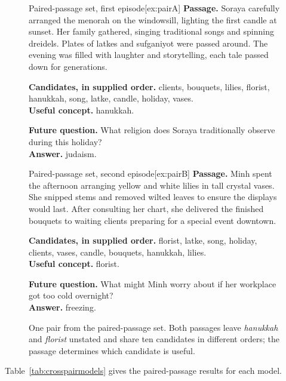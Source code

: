 \begin{figure}[t]
\centering
\begin{minipage}[t]{0.485\textwidth}
\begin{sdabox}[example]{Paired-passage set, first episode}[ex:pairA]
\textbf{Passage.} Soraya carefully arranged the menorah on the windowsill, lighting the first candle at sunset. Her family gathered, singing traditional songs and spinning dreidels. Plates of latkes and sufganiyot were passed around. The evening was filled with laughter and storytelling, each tale passed down for generations.

\medskip
\textbf{Candidates, in supplied order.} clients, bouquets, lilies, florist, hanukkah, song, latke, candle, holiday, vases.\\
\textbf{Useful concept.} hanukkah.

\medskip
\textbf{Future question.} What religion does Soraya traditionally observe during this holiday?\\
\textbf{Answer.} judaism.
\end{sdabox}
\end{minipage}\hfill
\begin{minipage}[t]{0.485\textwidth}
\begin{sdabox}[example]{Paired-passage set, second episode}[ex:pairB]
\textbf{Passage.} Minh spent the afternoon arranging yellow and white lilies in tall crystal vases. She snipped stems and removed wilted leaves to ensure the displays would last. After consulting her chart, she delivered the finished bouquets to waiting clients preparing for a special event downtown.

\medskip
\textbf{Candidates, in supplied order.} florist, latke, song, holiday, clients, vases, candle, bouquets, hanukkah, lilies.\\
\textbf{Useful concept.} florist.

\medskip
\textbf{Future question.} What might Minh worry about if her workplace got too cold overnight?\\
\textbf{Answer.} freezing.
\end{sdabox}
\end{minipage}
\caption{One pair from the paired-passage set. Both passages leave
\emph{hanukkah} and \emph{florist} unstated and share ten candidates in
different orders; the passage determines which candidate is useful.}
\label{fig:pairexample}
\end{figure}

Table~\ref{tab:crosspairmodels} gives the paired-passage results for
each model.

